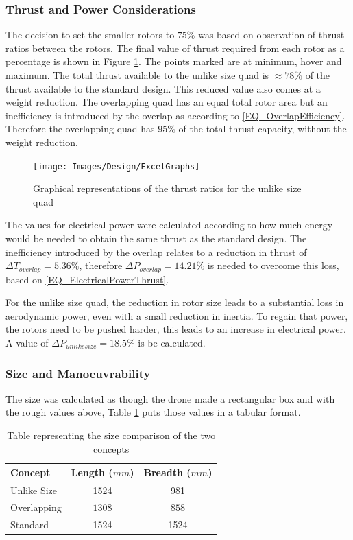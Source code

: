 			\subsubsection{Thrust and Power Considerations}
			The decision to set the smaller rotors to $75\%$ was based on observation of thrust ratios between the rotors. The final value of thrust required from each rotor as a percentage is shown in Figure \ref{IM_ExcelGraphs}. The points marked are at minimum, hover and maximum. The total thrust available to the unlike size quad is $\approx 78\%$ of the thrust available to the standard design. This reduced value also comes at a weight reduction. The overlapping quad has an equal total rotor area but an inefficiency is introduced by the overlap as according to \eqref{EQ_OverlapEfficiency}. Therefore the overlapping quad has $95\%$ of the total thrust capacity, without the weight reduction.
			
			\begin{figure}[H]
			\centering
			\texttt{[image: Images/Design/ExcelGraphs]}
			\caption{Graphical representations of the thrust ratios for the unlike size quad}
			\label{IM_ExcelGraphs}
			\end{figure}
			
			The values for electrical power were calculated according to how much energy would be needed to obtain the same thrust as the standard design. The inefficiency introduced by the overlap relates to a reduction in thrust of $\Delta T_{overlap} = 5.36\%$, therefore $\Delta P_{overlap} = 14.21\%$ is needed to overcome this loss, based on \eqref{EQ_ElectricalPowerThrust}. 
			
			For the unlike size quad, the reduction in rotor size leads to a substantial loss in aerodynamic power, even with a small reduction in inertia. To regain that power, the rotors need to be pushed harder, this leads to an increase in electrical power. A value of $\Delta P_{unlike size} = 18.5\%$ is be calculated.
	
			\subsubsection{Size and Manoeuvrability}
			The size was calculated as though the drone made a rectangular box and with the rough values above, Table \ref{TAB_SizeComparison} puts those values in a tabular format.
			
			\begin{table}[H]
				\centering
				\begin{tabular}{l | c | c }
					Concept & Length ($mm$) & Breadth ($mm$) \\
					\hline\hline
					Unlike Size	   	& 1524 & 981 \\
					Overlapping    & \boldmath$1308$ & \boldmath$858$ \\
					Standard		& 1524 & 1524\\
				\end{tabular}
				\label{TAB_SizeComparison}
				\caption{Table representing the size comparison of the two concepts}
			\end{table}
			
